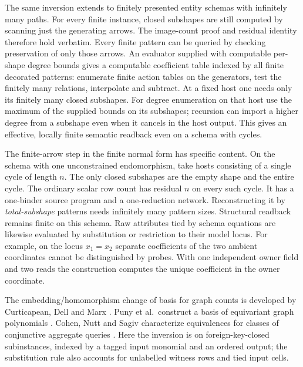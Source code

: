 \documentclass[11pt,a4paper]{article}
\theoremstyle{definition}
\theoremstyle{remark}\newaliascnt{remark}{theorem}
\numberwithin{equation}{section}
\begin{document}
The same inversion extends to finitely presented entity schemas with infinitely many paths. For every finite instance, closed subshapes are still computed by scanning just the generating arrows. The image-count proof and residual identity therefore hold verbatim. Every finite pattern can be queried by checking preservation of only those arrows. An evaluator supplied with computable per-shape degree bounds gives a computable coefficient table indexed by all finite decorated patterns: enumerate finite action tables on the generators, test the finitely many relations, interpolate and subtract. At a fixed host one needs only its finitely many closed subshapes. For degree enumeration on that host use the maximum of the supplied bounds on its subshapes; recursion can import a higher degree from a subshape even when it cancels in the host output. This gives an effective, locally finite semantic readback even on a schema with cycles.

The finite-arrow step in the finite normal form has specific content. On the schema with one unconstrained endomorphism, take hosts consisting of a single cycle of length $n$. The only closed subshapes are the empty shape and the entire cycle. The ordinary scalar row count has residual $n$ on every such cycle. It has a one-binder source program and a one-reduction network. Reconstructing it by \emph{total-subshape} patterns needs infinitely many pattern sizes. Structural readback remains finite on this schema. Raw attributes tied by schema equations are likewise evaluated by substitution or restriction to their model locus. For example, on the locus $x_1=x_2$ separate coefficients of the two ambient coordinates cannot be distinguished by probes. With one independent owner field and two reads the construction computes the unique coefficient in the owner coordinate.

The embedding/homomorphism change of basis for graph counts is developed by Curticapean, Dell and Marx \cite{motif-basis}. Puny et al.\ construct a basis of equivariant graph polynomials \cite{graph-poly-basis}. Cohen, Nutt and Sagiv characterize equivalences for classes of conjunctive aggregate queries \cite{aggregate-equivalence}. Here the inversion is on foreign-key-closed subinstances, indexed by a tagged input monomial and an ordered output; the substitution rule also accounts for unlabelled witness rows and tied input cells.
\end{document}
